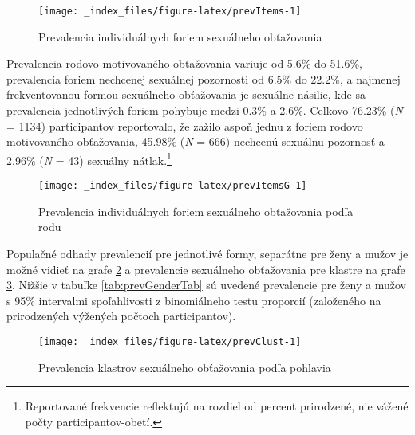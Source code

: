 \documentclass[
]{article}
\begin{document}
\begin{figure}

{\centering \texttt{[image: \_index\_files/figure-latex/prevItems-1]} 

}

\caption{Prevalencia individuálnych foriem sexuálneho obťažovania}\label{fig:prevItems}
\end{figure}

Prevalencia rodovo motivovaného obťažovania variuje od 5.6\% do 51.6\%, prevalencia foriem nechcenej sexuálnej pozornosti od 6.5\% do 22.2\%, a najmenej frekventovanou formou sexuálneho obťažovania je sexuálne násilie, kde sa prevalencia jednotlivých foriem pohybuje medzi 0.3\% a 2.6\%. Celkovo 76.23\% (\emph{N} = 1134) participantov reportovalo, že zažilo aspoň jednu z foriem rodovo motivovaného obťažovania, 45.98\% (\emph{N} = 666) nechcenú sexuálnu pozornosť a 2.96\% (\emph{N} = 43) sexuálny nátlak.\footnote{Reportované frekvencie reflektujú na rozdiel od percent prirodzené, nie vážené počty participantov-obetí.}

\begin{figure}

{\centering \texttt{[image: \_index\_files/figure-latex/prevItemsG-1]} 

}

\caption{Prevalencia individuálnych foriem sexuálneho obťažovania podľa rodu}\label{fig:prevItemsG}
\end{figure}

Populačné odhady prevalencií pre jednotlivé formy, separátne pre ženy a mužov je možné vidieť na grafe \ref{fig:prevItemsG} a prevalencie sexuálneho obťažovania pre klastre na grafe \ref{fig:prevClust}. Nižšie v tabuľke \ref{tab:prevGenderTab} sú uvedené prevalencie pre ženy a mužov s 95\% intervalmi spoľahlivosti z binomiálneho testu proporcií (založeného na prirodzených výžených počtoch participantov).

\begin{figure}

{\centering \texttt{[image: \_index\_files/figure-latex/prevClust-1]} 

}

\caption{Prevalencia klastrov sexuálneho obťažovania podľa pohlavia}\label{fig:prevClust}
\end{figure}
\end{document}
